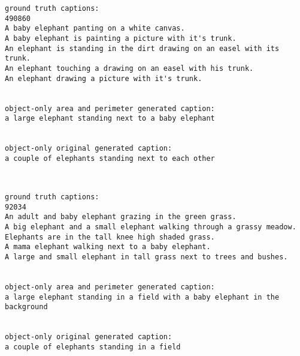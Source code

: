\documentclass[11pt]{article}
\begin{document}
    \begin{Verbatim}[commandchars=\\\{\}]
ground truth captions:
490860
A baby elephant panting on a white canvas.
A baby elephant is painting a picture with it's trunk. 
An elephant is standing in the dirt drawing on an easel with its trunk.
An elephant touching a drawing on an easel with his trunk.
An elephant drawing a picture with it's trunk.


object-only area and perimeter generated caption:
a large elephant standing next to a baby elephant


object-only original generated caption:
a couple of elephants standing next to each other

    \end{Verbatim}

    \begin{center}
    \end{center}
    { \hspace*{\fill} \\}
    
    \begin{Verbatim}[commandchars=\\\{\}]
ground truth captions:
92034
An adult and baby elephant grazing in the green grass.
A big elephant and a small elephant walking through a grassy meadow.
Elephants are in the tall knee high shaded grass.
A mama elephant walking next to a baby elephant.
A large and small elephant in tall grass next to trees and bushes.


object-only area and perimeter generated caption:
a large elephant standing in a field with a baby elephant in the background


object-only original generated caption:
a couple of elephants standing in a field

    \end{Verbatim}

    \begin{center}
    \end{center}
    { \hspace*{\fill} \\}
    
\end{document}
